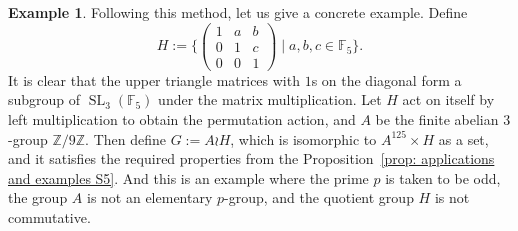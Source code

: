 \documentclass[12pt,a4paper]{amsart}
\numberwithin{equation}{section}%
\theoremstyle{plain}%
\theoremstyle{definition}%
\newtheorem{example}[theorem]{Example}%
\theoremstyle{remark}%
\begin{document}
\begin{example}
    	Following this method, let us give a concrete example.
    	Define
    	\begin{equation*}%
    		H:=\Biggl\{%
    		\begin{pmatrix}%
    			1&a&b\\%
    			0&1&c\\%
    			0&0&1
    		\end{pmatrix}%
    		\mid a,b,c\in\mathbb{F}_{5}
    		\Biggr\}.%
    	\end{equation*}%
    	It is clear that the upper triangle matrices with $1$s on the diagonal form a subgroup of $\operatorname{SL}_{3}(\mathbb{F}_{5})$ under the matrix multiplication.
    	Let $H$ act on itself by left multiplication to obtain the permutation action, and $A$ be the finite abelian $3$-group $\mathbb{Z}/9\mathbb{Z}$.
    	Then define $G:=A\wr H$, which is isomorphic to $A^{125}\times H$ as a set, and it satisfies the required properties from the Proposition~\ref{prop: applications and examples S5}.
    	And this is an example where the prime $p$ is taken to be odd, the group $A$ is not an elementary $p$-group, and the quotient group $H$ is not commutative.
    \end{example}%
    
\end{document}

